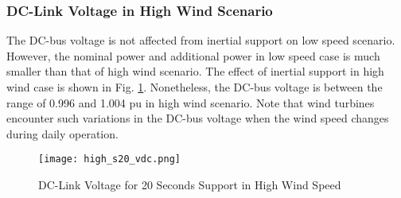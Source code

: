 \subsubsection{DC-Link Voltage in High Wind Scenario}
The DC-bus voltage is not affected from inertial support on low speed scenario. However, the nominal power and additional power in low speed case is much smaller than that of high wind scenario. The effect of inertial support in high wind case is shown in Fig. \ref{high_s20_vdc}. Nonetheless, the DC-bus voltage is between the range of 0.996 and 1.004 pu in high wind scenario. Note that wind turbines encounter such variations in the DC-bus voltage when the wind speed changes during daily operation. 
\begin{figure}[h!]
	\centering
	\texttt{[image: high\_s20\_vdc.png]}
	\caption{DC-Link Voltage for 20 Seconds Support in High Wind Speed}
	\label{high_s20_vdc}
\end{figure}